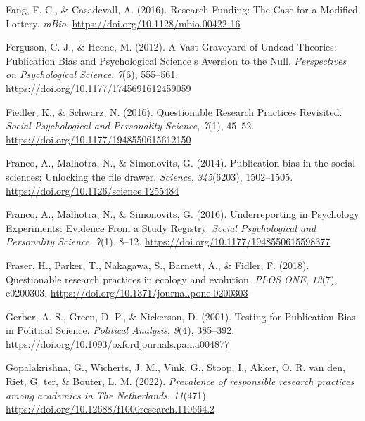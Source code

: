 \documentclass[
  ,man,mask,floatsintext]{apa6}
\newlength{\cslhangindent}
\newlength{\cslentryspacingunit} %
\newenvironment{CSLReferences}[2] %
 {%
  \setlength{\parindent}{0pt}
  \ifodd #1
  \let\oldpar\par
  \def\par{\hangindent=\cslhangindent\oldpar}
  \fi
  \setlength{\parskip}{#2\cslentryspacingunit}
 }%
 {}
\begin{document}
\begin{CSLReferences}{1}{0}
\leavevmode{}%
Fang, F. C., \& Casadevall, A. (2016). Research {Funding}: The {Case} for a {Modified Lottery}. \emph{mBio}. \url{https://doi.org/10.1128/mbio.00422-16}

\leavevmode{}%
Ferguson, C. J., \& Heene, M. (2012). A {Vast Graveyard} of {Undead Theories}: {Publication Bias} and {Psychological Science}'s {Aversion} to the {Null}. \emph{Perspectives on Psychological Science}, \emph{7}(6), 555--561. \url{https://doi.org/10.1177/1745691612459059}

\leavevmode{}%
Fiedler, K., \& Schwarz, N. (2016). Questionable {Research Practices Revisited}. \emph{Social Psychological and Personality Science}, \emph{7}(1), 45--52. \url{https://doi.org/10.1177/1948550615612150}

\leavevmode{}%
Franco, A., Malhotra, N., \& Simonovits, G. (2014). Publication bias in the social sciences: {Unlocking} the file drawer. \emph{Science}, \emph{345}(6203), 1502--1505. \url{https://doi.org/10.1126/science.1255484}

\leavevmode{}%
Franco, A., Malhotra, N., \& Simonovits, G. (2016). Underreporting in {Psychology Experiments}: {Evidence From} a {Study Registry}. \emph{Social Psychological and Personality Science}, \emph{7}(1), 8--12. \url{https://doi.org/10.1177/1948550615598377}

\leavevmode{}%
Fraser, H., Parker, T., Nakagawa, S., Barnett, A., \& Fidler, F. (2018). Questionable research practices in ecology and evolution. \emph{PLOS ONE}, \emph{13}(7), e0200303. \url{https://doi.org/10.1371/journal.pone.0200303}

\leavevmode{}%
Gerber, A. S., Green, D. P., \& Nickerson, D. (2001). Testing for {Publication Bias} in {Political Science}. \emph{Political Analysis}, \emph{9}(4), 385--392. \url{https://doi.org/10.1093/oxfordjournals.pan.a004877}

\leavevmode{}%
Gopalakrishna, G., Wicherts, J. M., Vink, G., Stoop, I., Akker, O. R. van den, Riet, G. ter, \& Bouter, L. M. (2022). \emph{Prevalence of responsible research practices among academics in {The Netherlands}}. \emph{11}(471). \url{https://doi.org/10.12688/f1000research.110664.2}


\end{CSLReferences}
\end{document}
